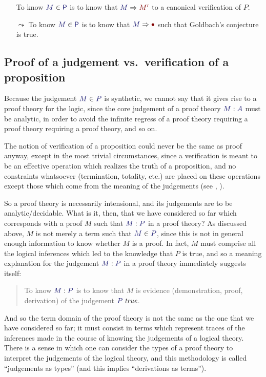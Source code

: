 \documentclass[main.tex]{subfiles}
\begin{document}
\begin{itemize}
  \item[] To know $\ver{M}{\mathsf{P}}$ is to know that $\reduce{M}{M'}$ to a
    canonical verification of $P$.
  \item[$\leadsto$] To know $\ver{M}{\mathsf{P}}$ is to know that
    $\reduce{M}{\bullet}$ such that Goldbach's conjecture is true.
\end{itemize}

\subsection{Proof of a judgement vs.\ verification of a proposition}

Because the judgement $\ver{M}{P}$ is synthetic, we cannot say that it
gives rise to a proof theory for the logic, since the core judgement
of a proof theory $\ofty{M}{A}$ must be analytic, in order to avoid the
infinite regress of a proof theory requiring a proof theory requiring
a proof theory, and so on.

The notion of verification of a proposition could never be the same as proof
anyway, except in the most trivial circumstances, since a verification is meant
to be an effective operation which realizes the truth of a proposition, and no
constraints whatsoever (termination, totality, etc.) are placed on these
operations except those which come from the meaning of the judgements (see
\cite{Dummett:Elements}, \cite{Prawitz12}).

So a proof theory is necessarily intensional, and its judgements are to be
analytic/decidable. What is it, then, that we have considered so far which
corresponds with a proof $M$ such that $\ofty{M}{P}$ in a proof theory? As discussed
above, $M$ is not merely a term such that $\ver{M}{P}$, since this is not in
general enough information to know whether $M$ is a proof. In fact, $M$ must
comprise all the logical inferences which led to the knowledge that $P$ is
true, and so a meaning explanation for the judgement $\ofty{M}{P}$ in a proof theory
immediately suggests itself:
\begin{quote}
  To know $\ofty{M}{P}$ is to know that $M$ is evidence (demonstration, proof,
  derivation) of the judgement $\istrue{P}$.
\end{quote}

And so the term domain of the proof theory is not the same as the one that we
have considered so far; it must consist in terms which represent traces of the
inferences made in the course of knowing the judgements of a logical theory.
There is a sense in which one can consider the types of a proof theory to
interpret the judgements of the logical theory, and this methodology is called
``judgements as types'' (and this implies ``derivations as terms'').
\end{document}

